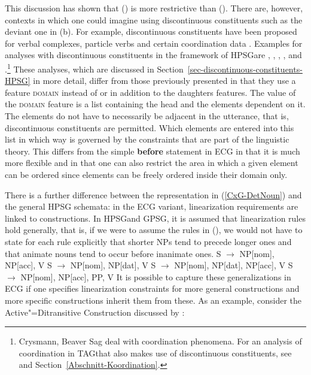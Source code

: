 This discussion has shown that () is more restrictive than (). There are, however, contexts in which one could imagine using
discontinuous constituents such as the deviant one in (b). For example, discontinuous constituents have been
proposed for verbal complexes, particle verbs and certain coordination data \citep{Wells47a}. 
Examples for analyses with discontinuous constituents in the framework of HPSG\indexhpsg are
, , , , and .\footnote{
	Crysmann, Beaver \biband Sag deal with coordination phenomena. For an analysis of coordination in TAG\indextag that also makes use of
	discontinuous constituents, see    and Section~\ref{Abschnitt-Koordination}.%
} These analyses, which are discussed in Section~\ref{sec-discontinuous-constituents-HPSG} in more
detail, differ from those previously presented in that they use a feature
\textsc{domain} instead of or in addition to the daughters features. The value of the
\textsc{domain} feature is a list containing the head and the elements dependent on it.
The elements do not have to necessarily be adjacent in the utterance, that is, discontinuous constituents are permitted.
Which elements are entered into this list in which way is governed by the constraints that are part of the linguistic theory.
This differs from the simple \textbf{before} statement in ECG in that it is much more flexible and
in that one can also restrict the area in which a given element can be ordered
since elements can be freely ordered inside their domain only.

There is a further difference between the representation in (\ref{CxG-DetNoun}) and the general HPSG
schemata: in the ECG variant, linearization
requirements are linked to constructions. In HPSG\indexhpsg and GPSG\indexgpsg, it is assumed that linearization rules
hold generally, that is, if we were to assume the rules in (), we would not have to state for each rule explicitly that shorter NPs tend to precede
longer ones and that animate nouns tend to occur before inanimate ones.
\eal
\ex S $\to$ NP[nom], NP[acc], V
\ex S $\to$ NP[nom], NP[dat], V
\ex S $\to$ NP[nom], NP[dat], NP[acc], V
\ex S $\to$ NP[nom], NP[acc], PP, V
\zl
\addlines[2]
It is possible to capture these generalizations in ECG if one specifies linearization constraints for more general constructions and more specific constructions
inherit them from these. As an example, consider the Active"=Ditransitive Construction discussed by
\citet[]{BC2005a}:

